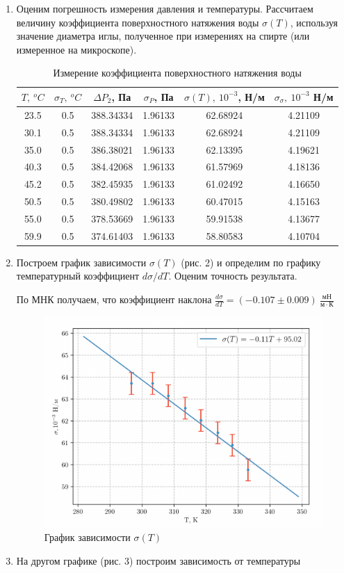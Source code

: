 \documentclass[12pt,a4paper]{article}
\begin{document}
\begin{enumerate}
    \item Оценим погрешность измерения давления и температуры. Рассчитаем величину коэффициента поверхностного натяжения воды $\sigma (T)$, используя значение диаметра иглы, полученное при измерениях на спирте (или измеренное на микроскопе).
    
    \begin{table}[ht]
        \centering
        \begin{tabular}{|c|c|c|c|c|c|}
        \hline
            $T,\ ^oC$ & $\sigma_T,\ ^oC$ & $\Delta P_2$, Па & $\sigma_P$, Па & $\sigma(T),\ 10^{-3}$, Н/м & $\sigma_{\sigma},\ 10^{-3}$ Н/м\\
            \hline
            23.5 & 0.5& 388.34334 & 1.96133&62.68924 & 4.21109\\
            \hline
            30.1 & 0.5& 388.34334 & 1.96133& 62.68924& 4.21109\\
            \hline
            35.0 &0.5 & 386.38021 & 1.96133& 62.13395& 4.19621\\
            \hline
            40.3 &0.5 & 384.42068 &1.96133 & 61.57969& 4.18136\\
            \hline
            45.2 & 0.5& 382.45935 &1.96133 & 61.02492& 4.16650\\
            \hline
            50.5 & 0.5& 380.49802 & 1.96133& 60.47015& 4.15163\\
            \hline
            55.0 &0.5 &378.53669 &1.96133 & 59.91538& 4.13677\\
            \hline
            59.9 &0.5 & 374.61403& 1.96133& 58.80583& 4.10704\\
            \hline
        \end{tabular}
        \caption{Измерение коэффициента поверхностного натяжения воды}
    \end{table}
    
    \item Построем график зависимости $\sigma (T)$ (рис. 2) и определим по графику температурный коэффициент $d\sigma / d T$. Оценим точность результата.
    
    По МНК получаем, что коэффициент наклона $\frac {d\sigma}{dT} = (-0.107\pm 0.009)\ \frac {мН}{м\cdot К}$
    \begin{figure}[ht]
    \centering
    \includegraphics[width=0.6\linewidth]{sigma_t.png}
    \caption{График зависимости $\sigma(T)$}
    \end{figure}
    \item На другом графике (рис. 3) построим зависимость от температуры
    

\end{enumerate}
\end{document}
